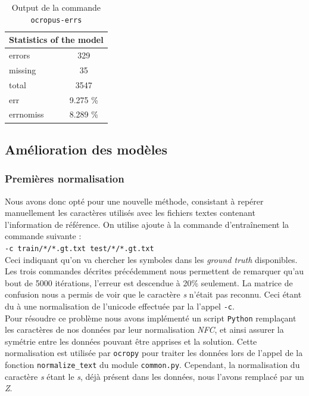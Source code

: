 \documentclass{article}
\newenvironment{oldstyle}{%
    \renewcommand\rmdefault{jkplvos}%
  \renewcommand\sfdefault{jkpssvos}%
  \renewcommand\ttdefault{jkpttvos}%
  \normalfont
}{}
\newcommand\s{\begin{oldstyle}s\end{oldstyle}}
\begin{document}
\begin{table}[!h]
    \centering
    \begin{tabular}{|l|l|lc|l|l|}
        \hline
        \multicolumn{6}{|c|}{\cellcolor[gray]{0.8}Statistics of the model}                   \\ \hline
        \multicolumn{3}{|l|}{errors}    & \multicolumn{3}{c|}{329}      \\ \hline
        \multicolumn{3}{|l|}{missing}   & \multicolumn{3}{c|}{35}       \\ \hline
        \multicolumn{3}{|l|}{total}     & \multicolumn{3}{c|}{3547}     \\ \hline
        \multicolumn{3}{|l|}{err}       & \multicolumn{3}{c|}{9.275 \%} \\ \hline
        \multicolumn{3}{|l|}{errnomiss} & \multicolumn{3}{c|}{8.289 \%} \\ \hline
    \end{tabular}
    \caption{Output de la commande \texttt{ocropus-errs}}
    \label{t1}
\end{table}

\subsection{Amélioration des modèles}

\subsubsection{Premières normalisation}

Nous avons donc opté pour une nouvelle méthode, consistant à repérer manuellement les caractères utilisés avec les fichiers textes contenant l'information de référence.
On utilise ajoute à la commande d'entraînement la commande suivante : \\
\texttt{-c train/*/*.gt.txt test/*/*.gt.txt} \\
Ceci indiquant qu'on va chercher les symboles dans les \textit{ground truth} disponibles.
Les trois commandes décrites précédemment nous permettent de remarquer qu'au bout de 5000 itérations, l'erreur est descendue à 20\% seulement. La matrice de confusion nous a permis de voir que le caractère \textit{\s} n'était pas reconnu. Ceci étant du à une normalisation de l'unicode effectuée par la l'appel \texttt{-c}. \\
Pour résoudre ce problème nous avons implémenté un script \texttt{Python} remplaçant les caractères de nos données par leur normalisation \textit{NFC}, et ainsi assurer la symétrie entre les données pouvant être apprises et la solution. Cette normalisation est utilisée par \texttt{ocropy} pour traiter les données lors de l'appel de la fonction \texttt{normalize\_text} du module \texttt{common.py}. Cependant, la normalisation du caractère \textit{\s} étant le \textit{s}, déjà présent dans les données, nous l'avons remplacé par un \textit{Z}.
\end{document}
